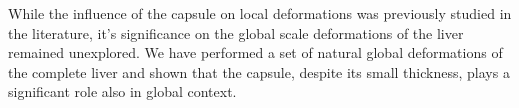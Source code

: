 \documentclass{llncs}
\begin{document}
While the influence of the capsule on local deformations was previously
studied in the literature, it's significance on the global scale
deformations of the liver remained unexplored. We have performed a set of
natural global deformations of the complete liver and shown that the
capsule, despite its small thickness, plays a significant role also in
global context.


%
%



\end{document}
